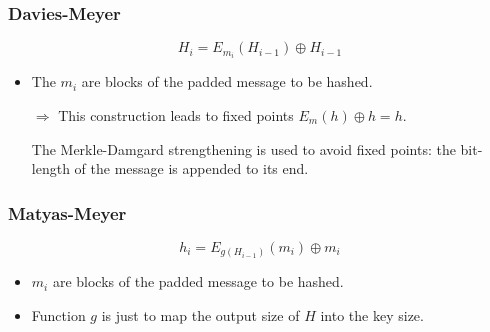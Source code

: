 \subsubsection{Davies-Meyer} 
$$H_i=E_{m_i}(H_{i-1})\oplus H_{i-1}$$ 

\begin{itemize}
    \item The $m_i$ are blocks of the padded message to be hashed. 
    \item[$\Rightarrow$] This
        construction leads to fixed points $E_m(h)\oplus h=h$.

        The Merkle-Damgard strengthening is used to avoid fixed points: the
        bit-length of the message is appended to its end.
\end{itemize}

\subsubsection{Matyas-Meyer} 
$$h_i = E_{g(H_{i-1})}(m_i)\oplus m_i$$

\begin{itemize}
    \item $m_i$ are blocks of the padded message to be hashed.
    \item Function $g$ is just to map the output size of $H$ into the key size.
\end{itemize}


